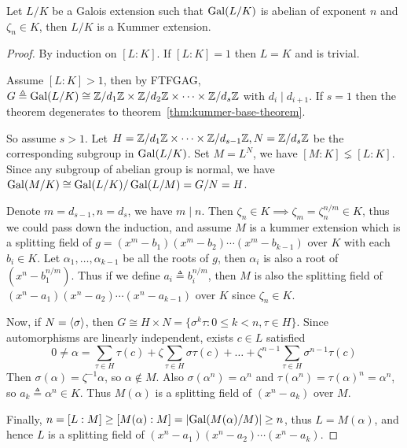 \begin{theorem}
  Let $L/K$ be a Galois extension such that $\operatorname{Gal}(L/K)$ is abelian of exponent $n$
  and $\zeta_n \in K$, then $L/K$ is a Kummer extension.

  \begin{proof}
    By induction on $[L: K]$. If $[L: K] = 1$ then $L = K$ and is trivial.

    Assume $[L: K] > 1$, then by FTFGAG, $G \triangleq \operatorname{Gal}(L/K) \cong {\mathbb{Z}}/{d_1 \mathbb{Z}}
    \times {\mathbb{Z}}/{d_2 \mathbb{Z}} \times \dots \times {\mathbb{Z}}/{d_s \mathbb{Z}}$ with $d_i \mid d_{i+1}$.
    If $s = 1$ then the theorem degenerates to theorem~\ref{thm:kummer-base-theorem}.

    So assume $s > 1$. Let $H = \mathbb{Z} / d_1 \mathbb{Z} \times \dots \times \mathbb{Z} / d_{s-1} \mathbb{Z},
    N = \mathbb{Z} / d_s \mathbb{Z}$ be the corresponding subgroup in $\operatorname{Gal}(L/K)$.
    Set $M = L^N$, we have $[M: K] \lneq [L: K]$. Since any subgroup
    of abelian group is normal, we have $\operatorname{Gal}(M/K) \cong \operatorname{Gal}(L/K) / \operatorname{Gal}(L/M) = G / N = H$.

    Denote $m = d_{s-1}, n = d_{s}$, we have $m \mid n$.
    Then $\zeta_n \in K \implies \zeta_m = \zeta_n^{n/m} \in K$,
    thus we could pass down the induction, and assume $M$ is a kummer extension which is a splitting
    field of $g = (x^m - b_1) (x^m - b_2) \dotsm (x^m - b_{k-1})$ over $K$ with each $b_i \in K$.
    Let $\alpha_1, \dots, \alpha_{k-1}$ be all the roots of $g$, then $\alpha_i$
    is also a root of $(x^n - b_1^{n/m})$. Thus if we define $a_i \triangleq b_i^{n/m}$, then
    $M$ is also the splitting field of $(x^n - a_1) (x^n - a_2) \dotsm (x^n - a_{k-1})$ over $K$
    since $\zeta_n \in K$.

    Now, if $N = \langle\sigma\rangle$, then $G \cong H \times N = \{\sigma^k \tau : 0 \leq k < n, \tau \in H\}$.
    Since automorphisms are linearly independent, exists $c \in L$ satisfied
    \[ 0 \neq \alpha = \sum_{\tau \in H} \tau(c) + \zeta \sum_{\tau \in H} \sigma \tau(c)
    + \dots + \zeta^{n-1} \sum_{\tau \in H} \sigma^{n-1} \tau(c) \]
    Then $\sigma(\alpha) = \zeta^{-1} \alpha$, so $\alpha \notin M$. Also $\sigma(\alpha^n) = \alpha^n$
    and $\tau(\alpha^n) = \tau(\alpha)^n = \alpha^n$, so $a_k \triangleq \alpha^n \in K$.
    Thus $M(\alpha)$ is a splitting field of $(x^n - a_k)$ over $M$.

    Finally, $n = [L: M] \geq [M(\alpha): M] = \lvert\operatorname{Gal}(M(\alpha) / M)\rvert \geq n$,
    thus $L = M(\alpha)$, and hence $L$ is a splitting field of
    $(x^n - a_1) (x^n - a_2) \dotsm (x^n - a_k)$.
  \end{proof}
\end{theorem}

